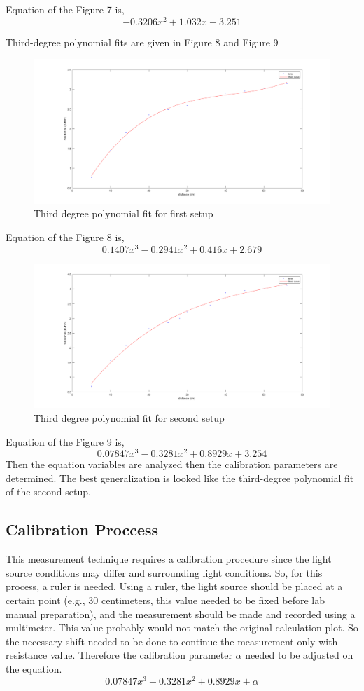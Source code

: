 \documentclass[letterpaper,12pt]{article}
\begin{document}
Equation of the Figure 7 is,
\[-0.3206 x^2 + 1.032x + 3.251\]

Third-degree polynomial fits are given in Figure 8 and Figure 9
\begin{figure}[H]
	\centering
   \includegraphics[width=1\textwidth]{open_fit.png}
   \caption{Third degree polynomial fit for first setup}
\end{figure} 
Equation of the Figure 8 is,
\[0.1407 x^3 -0.2941 x^2 +0.416 x + 2.679\]
\begin{figure}[H]
	\centering
   \includegraphics[width=1\textwidth]{closed_fit.png}
   \caption{Third degree polynomial fit for second setup}
\end{figure} 
Equation of the Figure 9 is,
\[0.07847 x^3 -0.3281 x^2 + 0.8929x + 3.254\]
Then the equation variables are analyzed then the calibration parameters are determined. The best generalization is looked like the third-degree polynomial fit of the second setup.
\subsection{Calibration Proccess}
This measurement technique requires a calibration procedure since the light source conditions may differ and surrounding light conditions. So, for this process, a ruler is needed. Using a ruler, the light source should be placed at a certain point (e.g., 30 centimeters, this value needed to be fixed before lab manual preparation), and the measurement should be made and recorded using a multimeter. This value probably would not match the original calculation plot. So the necessary shift needed to be done to continue the measurement only with resistance value. Therefore the calibration parameter \(\alpha\) needed to be adjusted on the equation.
\[0.07847 x^3 -0.3281 x^2 + 0.8929x + \alpha\]
\end{document}
